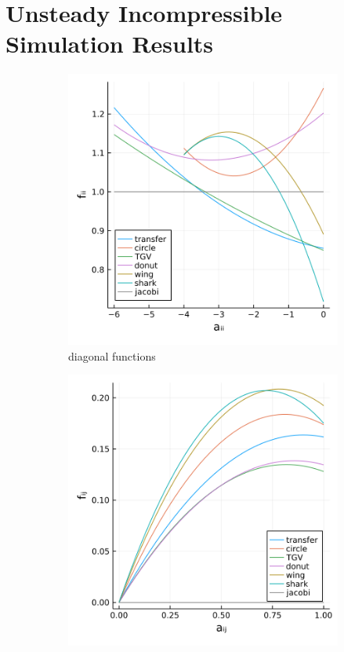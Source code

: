 \documentclass[review]{elsarticle}
\begin{document}
\section{Unsteady Incompressible Simulation Results}

\begin{figure}
    \centering
    \begin{subfigure}[b]{0.47\textwidth}
        \centering
        \includegraphics[width=\textwidth]{figures/diag_fun.png}
        \caption{diagonal functions}
        \label{fig:scaled loss}
    \end{subfigure}
    \hfill
    \begin{subfigure}[b]{0.47\textwidth}
        \centering
        \includegraphics[width=\textwidth]{figures/lower_fun.png}

\end{subfigure}
\end{figure}
\end{document}
